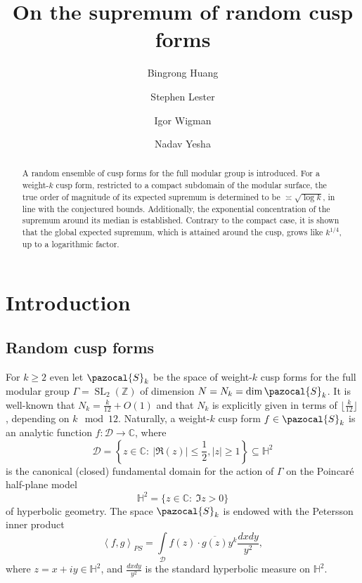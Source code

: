 \documentclass[12pt, a4paper]{amsart}
\title[Supremum of random cusp forms]{On the supremum of random cusp forms }
\author[Huang]{Bingrong Huang}
\author[Lester]{Stephen Lester}
\author[Wigman]{Igor Wigman}
\author[Yesha]{Nadav Yesha}
\newcommand{\tmop}[1]{\ensuremath{\operatorname{#1}}}
\theoremstyle{definition}
\newcommand {\1} {\mathbf{1}}
\newcommand {\C} {\mathbb {C}}
\newcommand {\Hb} {\mathbb {H}}
\newcommand {\Dc} {\mathcal{D}}
\newcommand{\Sc}{{\pazocal{S}}}
\numberwithin{equation}{section}
\begin{document}
\begin{abstract}

A random ensemble of cusp forms for the full modular group is introduced. For a weight-$k$ cusp form, restricted to a compact
subdomain of the modular surface, the true order of magnitude of its expected supremum is determined to be $\asymp \sqrt{\log{k}}$, in line with the conjectured bounds.
Additionally, the exponential concentration of the supremum around its median is established. Contrary to the compact case, it is shown that the global expected supremum, which is attained around the cusp,
grows like $k^{1/4}$, up to a logarithmic factor.

\end{abstract}
\maketitle


\section{Introduction}

\subsection{Random cusp forms}

For $k\ge 2$ even let $\Sc_{k}$ be the space of weight-$k$ cusp forms for the full modular group $\Gamma=\tmop{SL}_2(\mathbb Z)$ of dimension $N=N_{k}=\dim\Sc_{k}$. It is well-known that $N_{k}=\frac{k}{12}+O(1)$ and that $N_k$ is explicitly given in terms of
$\lfloor \frac{k}{12}\rfloor$, depending on $k\mod 12$.
Naturally, a weight-$k$ cusp form $f\in \Sc_{k}$ is an analytic function $f:\Dc\rightarrow\C$,
where $$\Dc = \left\{ z\in\C:\: |\Re(z)|\le \frac{1}{2}, |z|\ge 1 \right\}\subseteq \Hb^{2}$$ is the canonical (closed) fundamental domain for the action of $\Gamma$ on the Poincar\'{e} half-plane model
$$\Hb^{2}=\{z\in \C:\: \Im{z}>0\}$$ of hyperbolic geometry. The space $\Sc_{k}$ is endowed with
the Petersson inner product $$\left\langle f,g \right\rangle_{PS} = \int\limits_{\Dc}f(z)\cdot \overline{g(z)} y^{k}\frac{dxdy}{y^{2}},$$ where $z=x+iy\in\Hb^{2}$, and $\frac{dxdy}{y^{2}}$ is the standard hyperbolic measure on $\Hb^{2}$.
\end{document}
